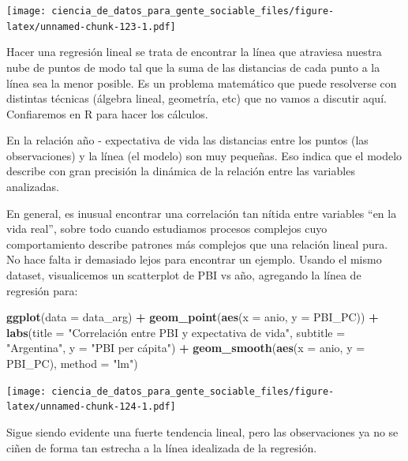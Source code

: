 \documentclass[spanish,]{book}
\newenvironment{Shaded}{\begin{snugshade}}{\end{snugshade}}
\newcommand{\DataTypeTok}[1]{\textcolor[rgb]{0.13,0.29,0.53}{#1}}
\newcommand{\KeywordTok}[1]{\textcolor[rgb]{0.13,0.29,0.53}{\textbf{#1}}}
\newcommand{\NormalTok}[1]{#1}
\newcommand{\OperatorTok}[1]{\textcolor[rgb]{0.81,0.36,0.00}{\textbf{#1}}}
\newcommand{\StringTok}[1]{\textcolor[rgb]{0.31,0.60,0.02}{#1}}
\begin{document}
\texttt{[image: ciencia\_de\_datos\_para\_gente\_sociable\_files/figure-latex/unnamed-chunk-123-1.pdf]}

Hacer una regresión lineal se trata de encontrar la línea que atraviesa nuestra nube de puntos de modo tal que la suma de las distancias de cada punto a la línea sea la menor posible. Es un problema matemático que puede resolverse con distintas técnicas (álgebra lineal, geometría, etc) que no vamos a discutir aquí. Confiaremos en R para hacer los cálculos.

En la relación año - expectativa de vida las distancias entre los puntos (las observaciones) y la línea (el modelo) son muy pequeñas. Eso indica que el modelo describe con gran precisión la dinámica de la relación entre las variables analizadas.

En general, es inusual encontrar una correlación tan nítida entre variables ``en la vida real'', sobre todo cuando estudiamos procesos complejos cuyo comportamiento describe patrones más complejos que una relación lineal pura. No hace falta ir demasiado lejos para encontrar un ejemplo. Usando el mismo dataset, visualicemos un scatterplot de PBI vs año, agregando la línea de regresión para:

\begin{Shaded}
\begin{Highlighting}[]
\KeywordTok{ggplot}\NormalTok{(}\DataTypeTok{data =}\NormalTok{ data_arg) }\OperatorTok{+}\StringTok{ }
\StringTok{    }\KeywordTok{geom_point}\NormalTok{(}\KeywordTok{aes}\NormalTok{(}\DataTypeTok{x =}\NormalTok{ anio, }\DataTypeTok{y =}\NormalTok{ PBI_PC)) }\OperatorTok{+}
\StringTok{    }\KeywordTok{labs}\NormalTok{(}\DataTypeTok{title =} \StringTok{"Correlación entre PBI y expectativa de vida"}\NormalTok{,}
         \DataTypeTok{subtitle =} \StringTok{"Argentina"}\NormalTok{,}
         \DataTypeTok{y =} \StringTok{"PBI per cápita"}\NormalTok{) }\OperatorTok{+}
\StringTok{    }\KeywordTok{geom_smooth}\NormalTok{(}\KeywordTok{aes}\NormalTok{(}\DataTypeTok{x =}\NormalTok{ anio, }\DataTypeTok{y =}\NormalTok{ PBI_PC), }\DataTypeTok{method =} \StringTok{"lm"}\NormalTok{)}
\end{Highlighting}
\end{Shaded}

\texttt{[image: ciencia\_de\_datos\_para\_gente\_sociable\_files/figure-latex/unnamed-chunk-124-1.pdf]}

Sigue siendo evidente una fuerte tendencia lineal, pero las observaciones ya no se ciñen de forma tan estrecha a la línea idealizada de la regresión.
\end{document}
